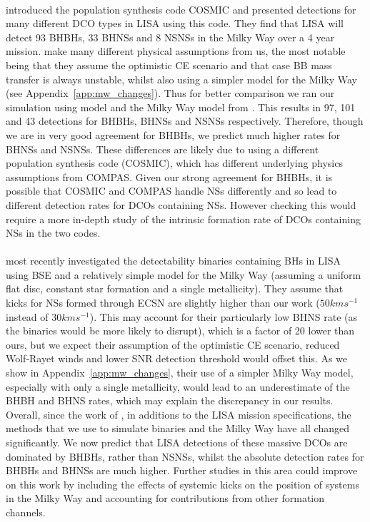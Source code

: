 \paragraph{\citet{Breivik+2020}} introduced the population synthesis code COSMIC and presented detections for many different DCO types in LISA using this code. They find that LISA will detect 93 BHBHs, 33 BHNSs and 8 NSNSs in the Milky Way over a 4 year mission. \citet{Breivik+2020} make many different physical assumptions from us, the most notable being that they assume the optimistic CE scenario and that case BB mass transfer is always unstable, whilst also using a simpler model for the Milky Way (see Appendix~\ref{app:mw_changes}). Thus for better comparison we ran our simulation using model \modCaseBBOpt{} and the Milky Way model from \citet{Breivik+2020}. This results in 97, 101 and 43 detections for BHBHs, BHNSs and NSNSs respectively. Therefore, though we are in very good agreement for BHBHs, we predict much higher rates for BHNSs and NSNSs. These differences are likely due to using a different population synthesis code (COSMIC), which has different underlying physics assumptions from COMPAS. Given our strong agreement for BHBHs, it is possible that COSMIC and COMPAS handle NSs differently and so lead to different detection rates for DCOs containing NSs. However checking this would require a more in-depth study of the intrinsic formation rate of DCOs containing NSs in the two codes.

\paragraph{\citet{Shao+2021}} most recently investigated the detectability binaries containing BHs in LISA using BSE and a relatively simple model for the Milky Way (assuming a uniform flat disc, constant star formation and a single metallicity). They assume that kicks for NSs formed through ECSN are slightly higher than our work ($50 \unit{km}{s^{-1}}$ instead of $30 \unit{km}{s^{-1}}$). This may account for their particularly low BHNS rate (as the binaries would be more likely to disrupt), which is a factor of 20 lower than ours, but we expect their assumption of the optimistic CE scenario, reduced Wolf-Rayet winds and lower SNR detection threshold would offset this. As we show in Appendix~\ref{app:mw_changes}, their use of a simpler Milky Way model, especially with only a single metallicity, would lead to an underestimate of the BHBH and BHNS rates, which may explain the discrepancy in our results.\\

\noindent{}Overall, since the work of \citet{Nelemans+2001}, in additions to the LISA mission specifications, the methods that we use to simulate binaries and the Milky Way have all changed significantly. We now predict that LISA detections of these massive DCOs are dominated by BHBHs, rather than NSNSs, whilst the absolute detection rates for BHBHs and BHNSs are much higher. Further studies in this area could improve on this work by including the effects of systemic kicks on the position of systems in the Milky Way and accounting for contributions from other formation channels.